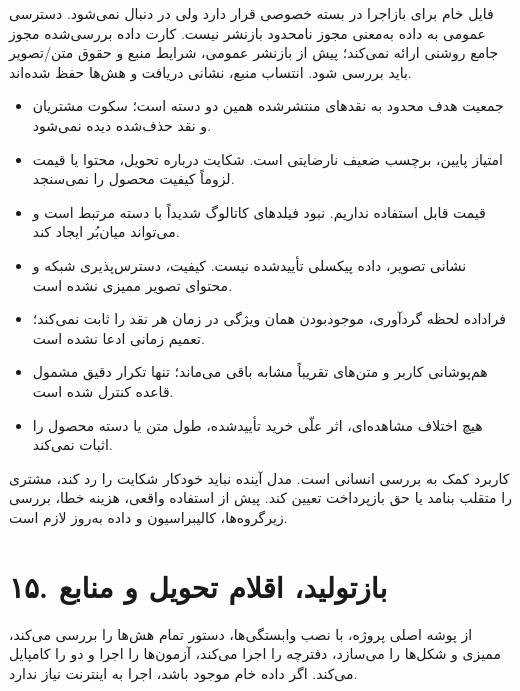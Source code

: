\documentclass[a4paper,12pt]{article}
\newcommand{\pageheading}[1]{\section*{\color{ink}#1}}
\begin{document}
فایل خام برای بازاجرا در بسته خصوصی قرار دارد ولی در  دنبال نمی‌شود. دسترسی عمومی به داده به‌معنی مجوز نامحدود بازنشر نیست. کارت داده بررسی‌شده مجوز جامع روشنی ارائه نمی‌کند؛ پیش از بازنشر عمومی، شرایط منبع و حقوق متن/تصویر باید بررسی شود. انتساب منبع، نشانی دریافت و هش‌ها حفظ شده‌اند.

\begin{itemize}
\item جمعیت هدف محدود به نقدهای منتشرشده همین دو دسته است؛ سکوت مشتریان و نقد حذف‌شده دیده نمی‌شود.
\item امتیاز پایین، برچسب ضعیف نارضایتی است. شکایت درباره تحویل، محتوا یا قیمت لزوماً کیفیت محصول را نمی‌سنجد.
\item قیمت قابل استفاده نداریم. نبود فیلدهای کاتالوگ شدیداً با دسته مرتبط است و می‌تواند میان‌بُر ایجاد کند.
\item نشانی تصویر، داده پیکسلی تأییدشده نیست. کیفیت، دسترس‌پذیری شبکه و محتوای تصویر ممیزی نشده است.
\item فراداده لحظه گردآوری، موجودبودن همان ویژگی در زمان هر نقد را ثابت نمی‌کند؛ تعمیم زمانی ادعا نشده است.
\item هم‌پوشانی کاربر و متن‌های تقریباً مشابه باقی می‌ماند؛ تنها تکرار دقیق مشمول قاعده کنترل شده است.
\item هیچ اختلاف مشاهده‌ای، اثر علّی خرید تأییدشده، طول متن یا دسته محصول را اثبات نمی‌کند.
\end{itemize}

کاربرد کمک به بررسی انسانی است. مدل آینده نباید خودکار شکایت را رد کند، مشتری را متقلب بنامد یا حق بازپرداخت تعیین کند. پیش از استفاده واقعی، هزینه خطا، بررسی زیرگروه‌ها، کالیبراسیون و داده به‌روز لازم است.

\newpage

\pageheading{۱۵. بازتولید، اقلام تحویل و منابع}

از پوشه اصلی پروژه، با نصب وابستگی‌ها، دستور  تمام هش‌ها را بررسی می‌کند، ممیزی و شکل‌ها را می‌سازد، دفترچه را اجرا می‌کند، آزمون‌ها را اجرا و دو  را کامپایل می‌کند. اگر داده خام موجود باشد، اجرا به اینترنت نیاز ندارد.
\end{document}
